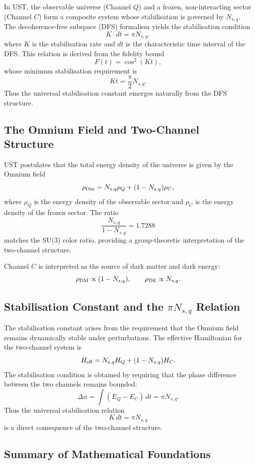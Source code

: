 In UST, the observable universe (Channel $Q$) and a frozen, non-interacting
sector (Channel $C$) form a composite system whose stabilisation is governed
by $N_{s,q}$. The decoherence-free subspace (DFS) formalism yields the
stabilisation condition
\[
K \cdot dt = \pi N_{s,q},
\]
where $K$ is the stabilisation rate and $dt$ is the characteristic time
interval of the DFS. This relation is derived from the fidelity bound
\[
F(t) = \cos^2(Kt),
\]
whose minimum stabilisation requirement is
\[
Kt = \frac{\pi}{2}N_{s,q}.
\]
Thus the universal stabilisation constant emerges naturally from the DFS
structure.

\subsection{The Omnium Field and Two-Channel Structure}

UST postulates that the total energy density of the universe is given by the
Omnium field
\[
\rho_{\rm Om} = N_{s,q}\rho_Q + (1-N_{s,q})\rho_C,
\]
where $\rho_Q$ is the energy density of the observable sector and $\rho_C$ is
the energy density of the frozen sector. The ratio
\[
\frac{N_{s,q}}{1-N_{s,q}} = 1.7288
\]
matches the SU(3) color ratio, providing a group-theoretic interpretation of
the two-channel structure.

Channel $C$ is interpreted as the source of dark matter and dark energy:
\[
\rho_{\rm DM} \propto (1-N_{s,q}), \qquad
\rho_{\rm DE} \propto N_{s,q}.
\]

\subsection{Stabilisation Constant and the $\pi N_{s,q}$ Relation}

The stabilisation constant arises from the requirement that the Omnium field
remains dynamically stable under perturbations. The effective Hamiltonian for
the two-channel system is
\[
H_{\rm eff} = N_{s,q}H_Q + (1-N_{s,q})H_C.
\]
The stabilisation condition is obtained by requiring that the phase difference
between the two channels remains bounded:
\[
\Delta\phi = \int (E_Q - E_C)\,dt = \pi N_{s,q}.
\]
Thus the universal stabilisation relation
\[
K\,dt = \pi N_{s,q}
\]
is a direct consequence of the two-channel structure.

\subsection{Summary of Mathematical Foundations}

